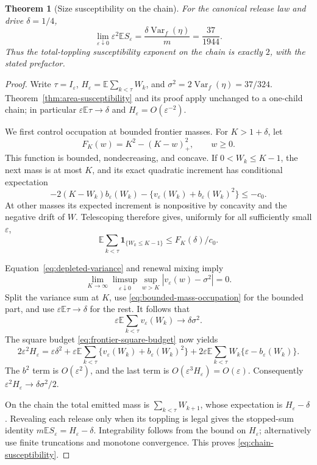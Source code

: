 \documentclass[11pt]{article}
\numberwithin{equation}{section}
\newtheorem{theorem}{Theorem}[section]
\theoremstyle{definition}
\newcommand{\E}{\mathbb E}
\newcommand{\ind}{\mathbf 1}
\newcommand{\Var}{\operatorname{Var}}
\begin{document}
\begin{theorem}[Size susceptibility on the chain]\label{thm:chain-susceptibility}
For the canonical release law and drive $\delta=1/4$,
\begin{equation}\label{eq:chain-susceptibility}
 \lim_{\varepsilon\downarrow0}\varepsilon^2\E S_\varepsilon
 =\frac{\delta\Var_f(\eta)}m=\frac{37}{1944}.
\end{equation}
Thus the total-toppling susceptibility exponent on the chain is exactly $2$, with the stated prefactor.
\end{theorem}
\begin{proof}
Write $\tau=I_\varepsilon$, $H_\varepsilon=\E\sum_{k<\tau}W_k$, and $\sigma^2=2\Var_f(\eta)=37/324$. Theorem~\ref{thm:area-susceptibility} and its proof apply unchanged to a one-child chain; in particular
$\varepsilon\E\tau\to\delta$ and $H_\varepsilon=O(\varepsilon^{-2})$.

We first control occupation at bounded frontier masses. For $K>1+\delta$, let
\[
 F_K(w)=K^2-(K-w)_+^2,\qquad w\ge0.
\]
This function is bounded, nondecreasing, and concave. If $0<W_k\le K-1$, the next mass is at most $K$, and its exact quadratic increment has conditional expectation
\[
 -2(K-W_k)b_\varepsilon(W_k)
 -\{v_\varepsilon(W_k)+b_\varepsilon(W_k)^2\}\le-c_0.
\]
At other masses its expected increment is nonpositive by concavity and the negative drift of $W$. Telescoping therefore gives, uniformly for all sufficiently small $\varepsilon$,
\begin{equation}\label{eq:bounded-mass-occupation}
 \E\sum_{k<\tau}\ind_{\{W_k\le K-1\}}
 \le F_K(\delta)/c_0.
\end{equation}

Equation~\eqref{eq:depleted-variance} and renewal mixing imply
\[
 \lim_{K\to\infty}\limsup_{\varepsilon\downarrow0}
 \sup_{w>K}|v_\varepsilon(w)-\sigma^2|=0.
\]
Split the variance sum at $K$, use \eqref{eq:bounded-mass-occupation} for the bounded part, and use $\varepsilon\E\tau\to\delta$ for the rest. It follows that
\begin{equation}\label{eq:variance-budget-limit}
 \varepsilon\E\sum_{k<\tau}v_\varepsilon(W_k)
 \longrightarrow\delta\sigma^2.
\end{equation}
The square budget \eqref{eq:frontier-square-budget} now yields
\[
 2\varepsilon^2H_\varepsilon
 =\varepsilon\delta^2
 +\varepsilon\E\sum_{k<\tau}\{v_\varepsilon(W_k)+b_\varepsilon(W_k)^2\}
 +2\varepsilon\E\sum_{k<\tau}W_k\{\varepsilon-b_\varepsilon(W_k)\}.
\]
The $b^2$ term is $O(\varepsilon^2)$, and the last term is $O(\varepsilon^3H_\varepsilon)=O(\varepsilon)$. Consequently $\varepsilon^2H_\varepsilon\to\delta\sigma^2/2$.

On the chain the total emitted mass is $\sum_{k<\tau}W_{k+1}$, whose expectation is $H_\varepsilon-\delta$. Revealing each release only when its toppling is legal gives the stopped-sum identity $m\E S_\varepsilon=H_\varepsilon-\delta$. Integrability follows from the bound on $H_\varepsilon$; alternatively use finite truncations and monotone convergence. This proves \eqref{eq:chain-susceptibility}.
\end{proof}
\end{document}
